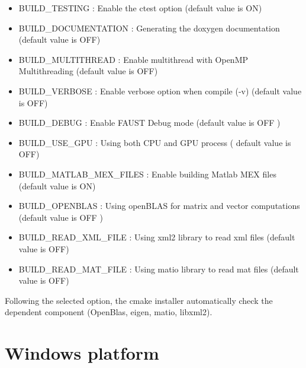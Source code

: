 \begin{itemize}
\item BUILD\_TESTING : Enable the ctest option (default value is ON)
\item BUILD\_DOCUMENTATION : Generating the doxygen documentation (default value is OFF)  
\item BUILD\_MULTITHREAD : Enable multithread with OpenMP Multithreading (default value is OFF)
\item BUILD\_VERBOSE : Enable verbose option when compile (-v) (default value is OFF)
\item BUILD\_DEBUG : Enable FAUST Debug mode (default value is OFF )
\item BUILD\_USE\_GPU : Using both CPU and GPU process ( default value is OFF)
\item BUILD\_MATLAB\_MEX\_FILES : Enable building Matlab MEX files (default value is ON)
\item BUILD\_OPENBLAS : Using openBLAS for matrix and vector computations (default value is OFF )
\item BUILD\_READ\_XML\_FILE : Using xml2 library to read xml files (default value is OFF)
\item BUILD\_READ\_MAT\_FILE : Using matio library to read mat files (default value is OFF)
\end{itemize}

Following the selected option, the cmake installer automatically check the dependent component (OpenBlas, eigen, matio, libxml2).  


\section{Windows platform}\label{sec:WinInstall}

